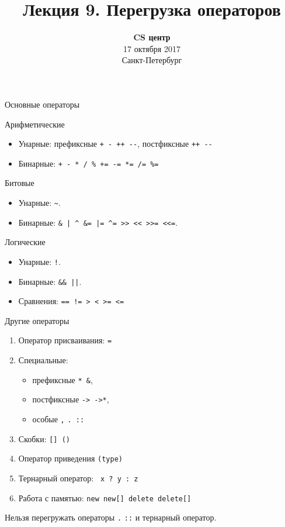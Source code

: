 \documentclass{beamer}
\title{Лекция 9. Перегрузка операторов}
\date{
   \textbf{CS центр}\\
   17 октября 2017 \\
   Санкт-Петербург
}
\begin{document}
\begin{frame} 
  \titlepage
\end{frame}

\begin{frame}[fragile]{Основные операторы}
    \begin{block}{Арифметические}
        \begin{itemize}
            \item Унарные: префиксные {\color{blue}\verb!+ - ++ --!},
                постфиксные {\color{blue}\verb!++ --!}
            \item Бинарные: {\color{blue}\verb!+ - * / % += -= *= /= %=!}
        \end{itemize}
    \end{block}
    \begin{block}{Битовые}
        \begin{itemize}
            \item Унарные: {\color{blue}\verb!~!}.
            \item Бинарные: {\color{blue}\verb!& | ^ &= |= ^= >> << >>= <<=!}.
        \end{itemize}
    \end{block}
    \begin{block}{Логические}
        \begin{itemize}
            \item Унарные: {\color{blue}\verb#!#}. 
            \item Бинарные: {\color{blue}\verb!&& ||!}.
            \item Сравнения: {\color{blue}\verb#== != > < >= <=#}
        \end{itemize}
    \end{block}
\end{frame}

\begin{frame}[fragile]{Другие операторы}
        \begin{enumerate}
            \item Оператор присваивания: {\color{blue}\verb!=!}
            \item Специальные: 
                \begin{itemize}
                    \item префиксные {\color{blue}\verb!* &!}, 
                    \item постфиксные  {\color{blue}\verb!-> ->*!}, 
                    \item особые {\color{blue}\verb!,! \verb!. ::!}
                \end{itemize}
            \item Скобки: {\color{blue}\verb![] ()!}
            \item Оператор приведения {\color{blue} \verb!(type)!}
            \item Тернарный оператор: {\color{blue}\verb! x ? y : z !}
            \item Работа с памятью: {\color{blue}\verb!new new[] delete delete[]!}
        \end{enumerate}

    Нельзя перегружать операторы {\color{blue}\verb!.! \verb!::!} и тернарный
    оператор.
\end{frame}
\end{document}
